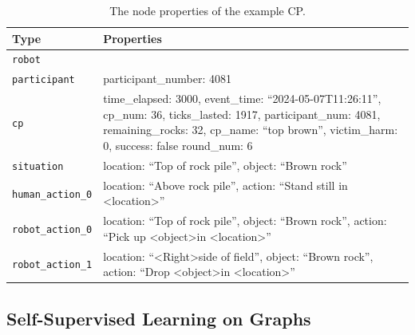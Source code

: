 \documentclass[letterpaper]{article} %
\begin{document}
\begin{table}[tb]
    \centering
    \renewcommand{\arraystretch}{1.2}
    \begin{tabular}{p{2.5cm} p{5.5cm}}
        \toprule
        \textbf{Type} & \textbf{Properties} \\
        \midrule
        \texttt{robot} &  \\
        \midrule
        \texttt{participant} & participant\_number: 4081 \\
        \midrule
        \texttt{cp} & time\_elapsed: 3000, \newline event\_time: ``2024-05-07T11:26:11'', \newline cp\_num: 36, \newline ticks\_lasted: 1917, \newline participant\_num: 4081, \newline remaining\_rocks: 32, \newline cp\_name: ``top brown'', \newline victim\_harm: 0, \newline success: false \newline round\_num: 6 \\
        \midrule
        \texttt{situation} & location: ``Top of rock pile'', \newline object: ``Brown rock'' \\
        \midrule
        \texttt{human\_action\_0} & location: ``Above rock pile'', \newline action: ``Stand still in \textless location\textgreater'' \\
        \midrule
        \texttt{robot\_action\_0} & location: ``Top of rock pile'', \newline object: ``Brown rock'', \newline action: ``Pick up \textless object\textgreater in \textless location\textgreater'' \\
        \midrule
        \texttt{robot\_action\_1} & location: ``\textless Right\textgreater side of field'', \newline object: ``Brown rock'', \newline action: ``Drop \textless object\textgreater in \textless location\textgreater'' \\
        \bottomrule
    \end{tabular}
    \caption{The node properties of the example CP.}
    \label{tab:cp_properties}
\end{table}

\subsection{Self-Supervised Learning on Graphs}
\label{sec:graph_learning}
\end{document}
